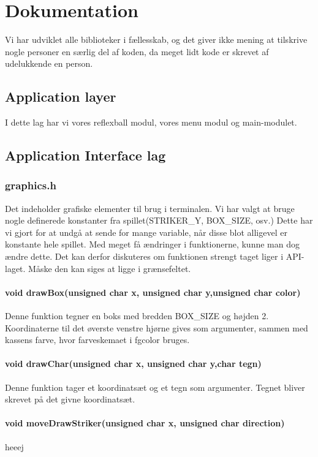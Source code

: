 \section{Dokumentation}
Vi har udviklet alle biblioteker i fællesskab, og det giver ikke mening at tilskrive nogle personer en særlig del af koden, da meget lidt kode er skrevet af udelukkende en person. 

\subsection{Application layer}
I dette lag har vi vores reflexball modul, vores menu modul og main-modulet.


\subsection{Application Interface lag}
\subsubsection{graphics.h}
Det indeholder grafiske elementer til brug i terminalen. Vi har valgt at bruge nogle definerede konstanter fra spillet(STRIKER\_Y, BOX\_SIZE, osv.) Dette har vi gjort for at undgå at sende for mange variable, når disse blot alligevel er konstante hele spillet. Med meget få ændringer i funktionerne, kunne man dog ændre dette. Det kan derfor diskuteres om funktionen strengt taget liger i API-laget. Måske den kan siges at ligge i grænsefeltet.
\paragraph{
void drawBox(unsigned char x, unsigned char y,unsigned char color)}
Denne funktion tegner en boks med bredden BOX\_SIZE og højden 2. Koordinaterne til det øverste venstre hjørne gives som argumenter, sammen med kassens farve, hvor farveskemaet i fgcolor bruges.

\paragraph{void drawChar(unsigned char x, unsigned char y,char tegn)}
Denne funktion tager et koordinatsæt og et tegn som argumenter. Tegnet bliver skrevet på det givne koordinatsæt.

\paragraph{void moveDrawStriker(unsigned char x, unsigned char direction)}
heeej

